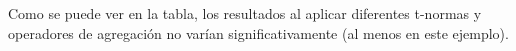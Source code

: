 \begin{center}
	\def\arraystretch{1.1}
    
    \label{tab:fire-detection-interpolation-comparison}
\end{center}

Como se puede ver en la tabla, los resultados al aplicar diferentes t-normas y operadores de agregación no varían significativamente (al menos en este ejemplo). 
